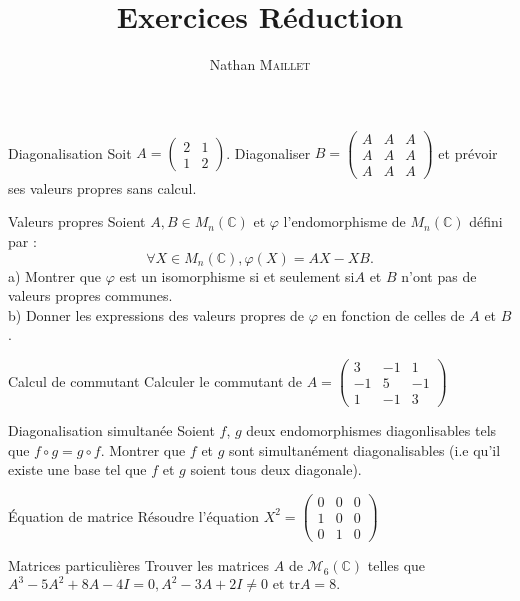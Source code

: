 \documentclass[french, a4paper, 11pt]{article}
\title{Exercices Réduction}
\author{Nathan \textsc{Maillet}}
\date{}
\newcommand{\ssi}{si et seulement si\xspace}		%
\newcommand{\C}{\mathbb{C}}   %
\newcommand{\po}{\left(}         %
\newcommand{\pf}{\right)}        %
\newcommand{\pof}[1]{\po #1 \pf} %
\begin{document}
\maketitle
\begin{cadre}{Diagonalisation}
    Soit \(A=\begin{pmatrix} 2 & 1 \\ 1 & 2 \end{pmatrix}\). Diagonaliser \(B=\begin{pmatrix}
        A & A & A \\
        A & A & A \\
        A & A & A
    \end{pmatrix}\) et prévoir ses valeurs propres sans calcul.
\end{cadre}

\begin{cadre}{Valeurs propres}
    Soient \(A,B \in M_n(\C)\) et \(\varphi\) l'endomorphisme de \(M_n(\C)\) défini par : 
        \[\forall X \in M_n(\C), \varphi(X)=AX-XB.\]
    a) Montrer que $\varphi$ est un isomorphisme \ssi $A$ et $B$ n'ont pas de valeurs propres communes.\\
    b) Donner les expressions des valeurs propres de $\varphi$ en fonction de celles de $A$ et $B$.
\end{cadre}

\begin{cadre}{Calcul de commutant}
    Calculer le commutant de \(A=\begin{pmatrix}
        3 & -1 & 1\\
        -1 & 5 & -1\\
        1 & -1 & 3
    \end{pmatrix}\)
\end{cadre}
 
\begin{cadre}{Diagonalisation simultanée}
    Soient \(f\), \(g\) deux endomorphismes diagonlisables tels que \(f\circ g=g\circ f\). Montrer que \(f\) et \(g\)
    sont simultanément diagonalisables (i.e qu'il existe une base tel que \(f\) et \(g\) soient tous deux diagonale).
\end{cadre}

\begin{cadre}{Équation de matrice}
    Résoudre l'équation \(X^2=\begin{pmatrix}
        0 & 0 & 0\\
        1 & 0 & 0\\
        0 & 1 & 0
    \end{pmatrix}\)
\end{cadre}

\begin{cadre}{Matrices particulières}
    Trouver les matrices $A$ de $\mathcal{M}_6\pof{\C}$ telles que
    \(A^3-5A^2+8A-4I=0, A^2-3A+2I \neq 0 \text{ et tr}A=8.\)
\end{cadre}
\end{document}
